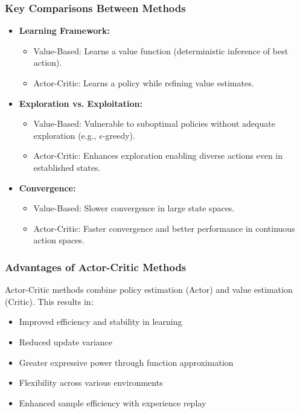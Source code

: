 \documentclass{beamer}
\begin{document}
\begin{frame}[fragile]
    \frametitle{Key Comparisons Between Methods}
    \begin{itemize}
        \item \textbf{Learning Framework:}
        \begin{itemize}
            \item Value-Based: Learns a value function (deterministic inference of best action).
            \item Actor-Critic: Learns a policy while refining value estimates.
        \end{itemize}

        \item \textbf{Exploration vs. Exploitation:}
        \begin{itemize}
            \item Value-Based: Vulnerable to suboptimal policies without adequate exploration (e.g., \( \epsilon \)-greedy).
            \item Actor-Critic: Enhances exploration enabling diverse actions even in established states.
        \end{itemize}

        \item \textbf{Convergence:}
        \begin{itemize}
            \item Value-Based: Slower convergence in large state spaces.
            \item Actor-Critic: Faster convergence and better performance in continuous action spaces.
        \end{itemize}
    \end{itemize}
\end{frame}

\begin{frame}[fragile]
    \frametitle{Advantages of Actor-Critic Methods}
    Actor-Critic methods combine policy estimation (Actor) and value estimation (Critic). This results in:
    \begin{itemize}
        \item Improved efficiency and stability in learning
        \item Reduced update variance
        \item Greater expressive power through function approximation
        \item Flexibility across various environments
        \item Enhanced sample efficiency with experience replay
    \end{itemize}
\end{frame}
\end{document}
